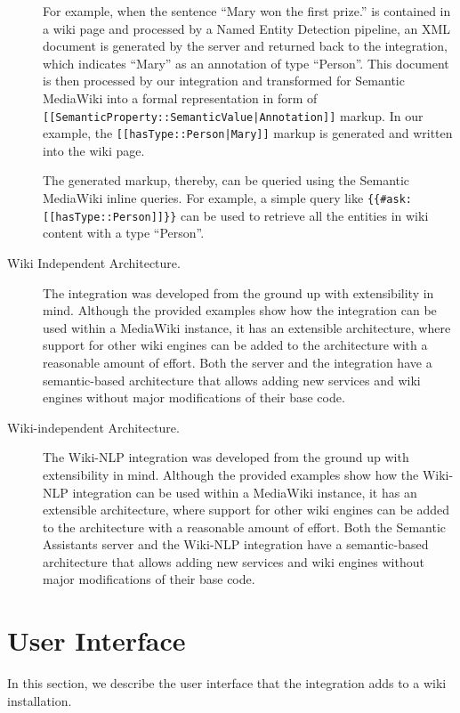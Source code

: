 \begin{description}
For example, when the sentence ``Mary won the first prize.'' is contained in a wiki page and processed by a Named Entity Detection pipeline, an XML document is generated by the \sa server and returned back to the \wikinlp integration, which indicates ``Mary'' as an annotation of type ``Person''. This document is then processed by our integration and transformed for Semantic MediaWiki into a formal representation in form of \texttt{[[SemanticProperty::SemanticValue|Annotation]]} markup. In our example, the \texttt{[[hasType::Person|Mary]]} markup is generated and written into the wiki page.

The generated markup, thereby, can be queried using the Semantic MediaWiki inline queries. For example, a simple query like \texttt{\{\{\#ask: [[hasType::Person]]\}\}} can be used to retrieve all the entities in wiki content with a type ``Person''.

\item[Wiki Independent Architecture.] The \wikinlp integration was developed from the ground up with extensibility in mind. Although the provided examples show how the \wikinlp integration can be used within a MediaWiki instance, it has an extensible architecture, where support for other wiki engines can be added to the architecture with a reasonable amount of effort. Both the \sa server and the \wikinlp integration have a semantic-based architecture that allows adding new services and wiki engines without major modifications of their base code.

\item[Wiki-independent Architecture.]
The Wiki-NLP integration was developed from the ground up with extensibility in mind. Although the provided examples show how the Wiki-NLP integration can be used within a MediaWiki instance, it has an extensible architecture, where support for other wiki engines can be added to the architecture with a reasonable amount of effort. Both the Semantic Assistants server and the Wiki-NLP integration have a semantic-based architecture that allows adding new services and wiki engines without major modifications of their base code.
\end{description}



\section{User Interface}
In this section, we describe the user interface that the \wikinlp integration adds to a wiki installation.

